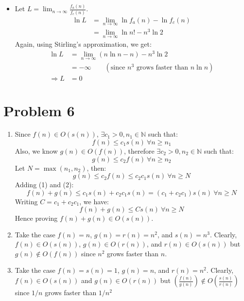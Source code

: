 \documentclass{article}
\begin{document}
\begin{itemize}
    \item[$f_a < f_c$] Let $L = \lim_{n \to \infty} \frac{f_a(n)}{f_c(n)}$.
    \begin{align*}
      \ln L &= \lim_{n \to \infty} \ln f_a(n) - \ln f_c(n) \\
      &= \lim_{n \to \infty} \ln n! - n^3 \ln 2
    \end{align*}
    Again, using Stirling's approximation, we get:
    \begin{align*}
      \ln L &= \lim_{n \to \infty} (n \ln n - n) - n^3 \ln 2 \\
      &= -\infty \qquad (\text{since } n^3 \text{ grows faster than } n \ln n) \\
      \Rightarrow L &= 0
    \end{align*}
  \end{itemize}

\section{Problem 6}

  \begin{enumerate}[label=(\alph*)]
    \item Since $f(n) \in O(s(n))$, $\exists c_1 > 0, n_1 \in \mathbb{N}$ such that:
    \[ f(n) \leq c_1 s(n) ~ \forall n \geq n_1 \tag{1} \]
    Also, we know $g(n) \in O(f(n))$, therefore $\exists c_2 > 0, n_2 \in \mathbb{N}$ such that:
    \[ g(n) \leq c_2 f(n) ~ \forall n \geq n_2 \]
    Let $N = \max(n_1, n_2)$, then:
    \[ g(n) \leq c_2 f(n) \leq c_2 c_1 s(n) ~ \forall n \geq N \tag{2} \]
    Adding (1) and (2):
    \[ f(n) + g(n) \leq c_1 s(n) + c_2 c_1 s(n) = (c_1 + c_2 c_1)s(n) ~ \forall n \geq N \]
    Writing $C = c_1 + c_2 c_1$, we have:
    \[ f(n) + g(n) \leq C s(n) ~ \forall n \geq N \]
    Hence proving $f(n) + g(n) \in O(s(n))$.

    \item Take the case $f(n) = n$, $g(n) = r(n) = n^2$, and $s(n) = n^3$.
    Clearly, $f(n) \in O(s(n))$, $g(n) \in O(r(n))$, and $r(n) \in O(s(n))$ but $g(n) \notin O(f(n))$ since $n^2$ grows faster than $n$.

    \item Take the case $f(n) = s(n) = 1$, $g(n) = n$, and $r(n) = n^2$.
    Clearly, $f(n) \in O(s(n))$ and $g(n) \in O(r(n))$ but $\left( \frac{f(n)}{g(n)} \right) \notin O\left( \frac{s(n)}{r(n)} \right)$ since $1 / n$ grows faster than $1 / n^2$
  \end{enumerate}
\end{document}
